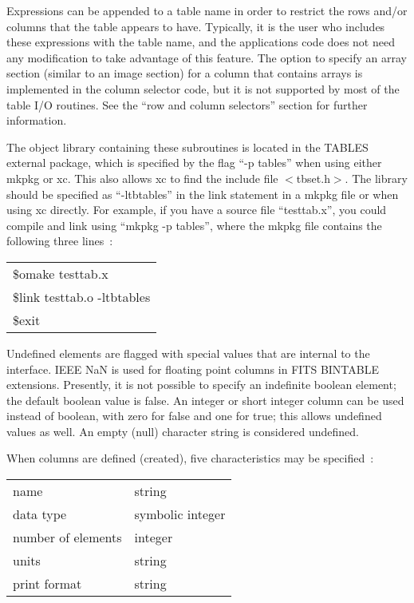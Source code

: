 Expressions can be appended to a table name
in order to restrict the rows and/or columns
that the table appears to have.
Typically, it is the user who includes these expressions with the table name,
and the applications code does not need any modification
to take advantage of this feature.
The option to specify an array section
(similar to an image section)
for a column that contains arrays
is implemented in the column selector code,
but it is not supported by most of the table I/O routines.
See the ``row and column selectors'' section for further information.

The object library containing these subroutines
is located in the TABLES external package,
which is specified by the flag ``-p tables''
when using either mkpkg or xc.
This also allows xc to find the include file $<$tbset.h$>$.
The library should be specified as ``-ltbtables''
in the link statement in a mkpkg file or when using xc directly.
For example, if you have a source file ``testtab.x'',
you could compile and link using ``mkpkg -p tables'',
where the mkpkg file contains the following three lines~:
\begin{center}
\begin{tabular}{l}
\$omake testtab.x \\
\$link testtab.o -ltbtables \\
\$exit \\
\end{tabular}
\end{center}

Undefined elements are flagged with special values
that are internal to the interface.
IEEE NaN is used for floating point columns
in FITS BINTABLE extensions.
Presently, it is not possible to specify an indefinite boolean element;
the default boolean value is false.
An integer or short integer column
can be used instead of boolean,
with zero for false and one for true;
this allows undefined values as well.
An empty (null) character string is considered undefined.

When columns are defined (created), five characteristics may be specified~:
\begin{center}
\begin{tabular}{ll}
name & string \\
data type & symbolic integer \\
number of elements & integer \\
units & string \\
print format & string \\
\end{tabular}
\end{center}

